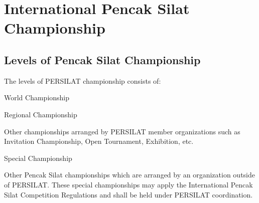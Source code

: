 \chapter{International Pencak Silat Championship}

\section{Levels of Pencak Silat Championship}

\begin{legal}
\item The levels of PERSILAT championship consists of:

    \begin{legal}
    \item World Championship
    \item Regional Championship
    \item Other championships arranged by PERSILAT member organizations such as Invitation Championship, 
        Open Tournament, Exhibition, etc.
    \end{legal}

\item Special Championship

Other Pencak Silat championships which are arranged by an organization outside of
PERSILAT. These special championships may apply the International Pencak Silat
Competition Regulations and shall be held under PERSILAT coordination.
\end{legal}
